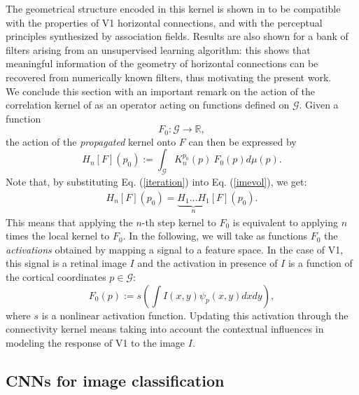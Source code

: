 \documentclass[11pt,oneside,reqno]{amsart}
\begin{document}
 The geometrical structure encoded in this kernel is shown in \citet{neuro} to be compatible with the properties of V1 horizontal connections, and with the perceptual principles synthesized by association fields. Results are also shown for a bank of filters arising from an unsupervised learning algorithm: this shows that meaningful information of the geometry of horizontal connections can be recovered from numerically known filters, thus motivating the present work.\\
 
 We conclude this section with an important remark on the action of the correlation kernel of \cite{neuro} as an operator acting on functions defined on $\mathcal{G}$. Given a function 
 \[F_0 : \mathcal{G} \longrightarrow \mathbb{R},\]
 the action of the \emph{propagated} kernel onto $F$ can then be expressed by
 \begin{equation}\label{imevol} H_{n}[F](p_0) := \int_\mathcal{G} K_n^{p_0}(p) \: F_0(p) d\mu(p).\end{equation}
 Note that, by substituting Eq. (\ref{iteration}) into Eq. (\ref{imevol}), we get:
 \begin{align*}H_{n}[F](p_0) = 
\underbrace{H_1 \ldots H_1}_n[F](p_0).\end{align*}
 This means that applying the $n$-th step kernel to $F_0$ is equivalent to applying $n$ times the local kernel to $F_0$. In the following, we will take as functions $F_0$ the \emph{activations} obtained by mapping a signal to a feature space. In the case of V1, this signal is a retinal image $I$ and the activation in presence of $I$ is a function of the cortical coordinates $p \in \mathcal{G}$:
 \[ F_0(p) := s\left(\int I(x,y)\psi_p(x,y) dxdy\right),\]
 where $s$ is a nonlinear activation function. Updating this activation through the connectivity kernel means taking into account the contextual influences in modeling the response of V1 to the image $I$.
 
 \subsection{CNNs for image classification}
 
\end{document}
